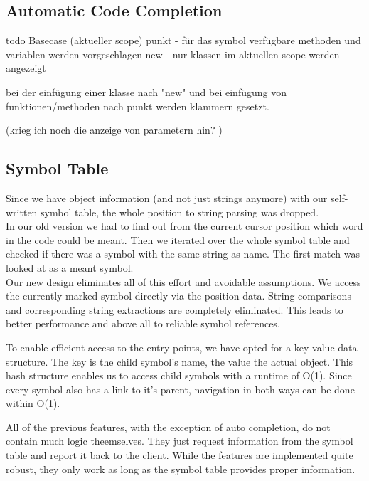 \subsection{Automatic Code Completion}
todo
Basecase (aktueller scope)
punkt - für das symbol verfügbare methoden und variablen werden vorgeschlagen
new - nur klassen im aktuellen scope werden angezeigt

bei der einfügung einer klasse nach "new" und bei einfügung von funktionen/methoden nach punkt werden klammern gesetzt.

(krieg ich noch die anzeige von parametern hin? )

\subsection{Symbol Table}

Since we have object information (and not just strings anymore) with our self-written symbol table,
the whole position to string parsing was dropped. \\

In our old version we had to find out from the current cursor position which word in the code could be meant.
Then we iterated over the whole symbol table and checked if there was a symbol with the same string as name.
The first match was looked at as a meant symbol. \\

Our new design eliminates all of this effort and avoidable assumptions.
We access the currently marked symbol directly via the position data.
String comparisons and corresponding string extractions are completely eliminated.
This leads to better performance and above all to reliable symbol references.

To enable efficient access to the entry points, we have opted for a key-value data structure.
The key is the child symbol's name, the value the actual  object.
This hash structure enables us to access child symbols with a runtime of O(1).
Since every symbol also has a link to it's parent, navigation in both ways can be done within O(1).


All of the previous features, with the exception of auto completion, do not contain much logic theemselves.
They just request information from the symbol table and report it back to the client.
While the features are implemented quite robust, they only work as long as the symbol table provides proper information.

